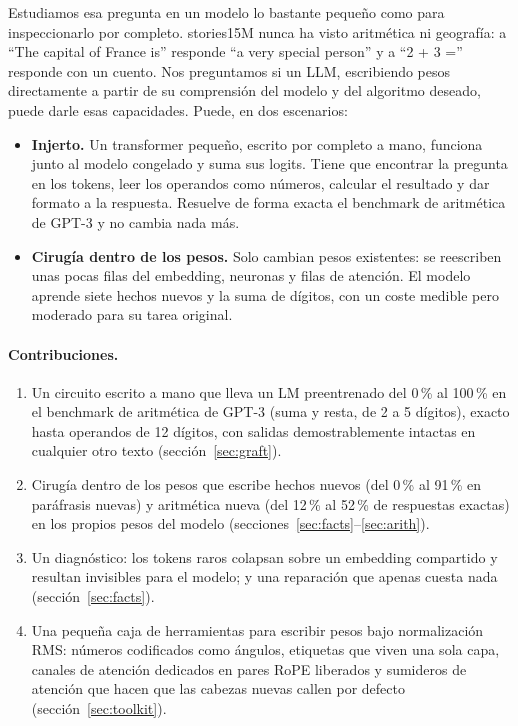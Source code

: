 \documentclass[11pt]{article}
\begin{document}
Estudiamos esa pregunta en un modelo lo bastante pequeño como para inspeccionarlo por completo. stories15M nunca ha visto aritmética ni geografía: a ``The capital of France is'' responde ``a very special person'' y a ``2 + 3 ='' responde con un cuento. Nos preguntamos si un LLM, escribiendo pesos directamente a partir de su comprensión del modelo y del algoritmo deseado, puede darle esas capacidades. Puede, en dos escenarios:
\begin{itemize}[leftmargin=*]
\item \textbf{Injerto.} Un transformer pequeño, escrito por completo a mano, funciona junto al modelo congelado y suma sus logits. Tiene que encontrar la pregunta en los tokens, leer los operandos como números, calcular el resultado y dar formato a la respuesta. Resuelve de forma exacta el benchmark de aritmética de GPT-3 y no cambia nada más.
\item \textbf{Cirugía dentro de los pesos.} Solo cambian pesos existentes: se reescriben unas pocas filas del embedding, neuronas y filas de atención. El modelo aprende siete hechos nuevos y la suma de dígitos, con un coste medible pero moderado para su tarea original.
\end{itemize}

\paragraph{Contribuciones.}
\begin{enumerate}[leftmargin=*]
\item Un circuito escrito a mano que lleva un LM preentrenado del 0\,\% al 100\,\% en el benchmark de aritmética de GPT-3 (suma y resta, de 2 a 5 dígitos), exacto hasta operandos de 12 dígitos, con salidas demostrablemente intactas en cualquier otro texto (sección~\ref{sec:graft}).
\item Cirugía dentro de los pesos que escribe hechos nuevos (del 0\,\% al 91\,\% en paráfrasis nuevas) y aritmética nueva (del 12\,\% al 52\,\% de respuestas exactas) en los propios pesos del modelo (secciones~\ref{sec:facts}--\ref{sec:arith}).
\item Un diagnóstico: los tokens raros colapsan sobre un embedding compartido y resultan invisibles para el modelo; y una reparación que apenas cuesta nada (sección~\ref{sec:facts}).
\item Una pequeña caja de herramientas para escribir pesos bajo normalización RMS: números codificados como ángulos, etiquetas que viven una sola capa, canales de atención dedicados en pares RoPE liberados y sumideros de atención que hacen que las cabezas nuevas callen por defecto (sección~\ref{sec:toolkit}).
\end{enumerate}
\end{document}
